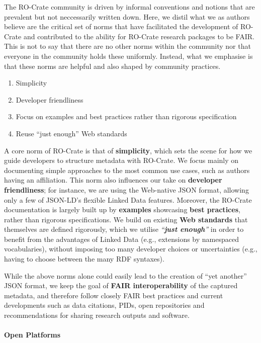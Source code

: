 {The RO-Crate community is driven by informal conventions and notions
that are prevalent but not neccessarily written down. Here, we distil
what we as authors believe are the critical set of norms that have
facilitated the development of RO-Crate and contributed to the ability
for RO-Crate research packages to be FAIR. This is not to say that there
are no other norms within the community nor that everyone in the
community holds these uniformly. Instead, what we emphasise is that
these norms are helpful and also shaped by community practices.

\begin{enumerate}
\def\labelenumi{\arabic{enumi}.}
\tightlist
\item
  Simplicity
\item
  Developer friendliness
\item
  Focus on examples and best practices rather than rigorous
  specification
\item
  Reuse ``just enough'' Web standards
\end{enumerate}

A core norm of RO-Crate is that of \textbf{simplicity}, which sets the
scene for how we guide developers to structure metadata with RO-Crate.
We focus mainly on documenting simple approaches to the most common use
cases, such as authors having an affiliation. This norm also influences
our take on \textbf{developer friendliness}; for instance, we are using
the Web-native JSON format, allowing only a few of JSON-LD's flexible
Linked Data features. Moreover, the RO-Crate documentation is largely
built up by \textbf{examples} showcasing \textbf{best practices}, rather
than rigorous specifications. We build on existing \textbf{Web
standards} that themselves are defined rigorously, which we utilise
\emph{``\textbf{just enough}''} in order to benefit from the advantages
of Linked Data (e.g., extensions by namespaced vocabularies), without
imposing too many developer choices or uncertainties (e.g., having to
choose between the many RDF syntaxes).

While the above norms alone could easily lead to the creation of ``yet
another'' JSON format, we keep the goal of \textbf{FAIR
interoperability} of the captured metadata, and therefore follow closely
FAIR best practices and current developments such as data citations,
PIDs, open repositories and recommendations for sharing research outputs
and software.

\hypertarget{open-platforms}{%
\paragraph{Open Platforms}\label{open-platforms}}

}
